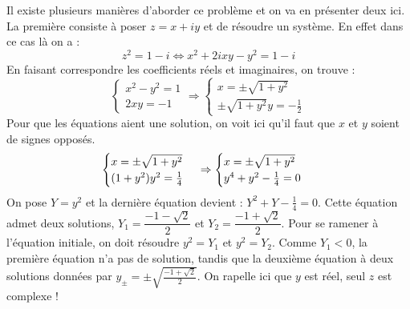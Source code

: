 \documentclass{article}
\begin{document}
Il existe plusieurs manières d'aborder ce problème et on va en présenter deux ici. La première consiste à poser $z = x +iy$ et de résoudre un système. En effet dans ce cas là on a : 
\begin{equation*}
    z^2 = 1-i \iff x^2+2ixy-y^2 = 1-i
\end{equation*}
En faisant correspondre les coefficients réels et imaginaires, on trouve :
\begin{equation*}
    \begin{cases}
        x^2-y^2=1 \\
        2xy = -1
    \end{cases}
    \Rightarrow
     \begin{cases}
        x = \pm\sqrt{1+y^2} \\
        \pm\sqrt{1+y^2}y =-\frac{1}{2} 
    \end{cases}
\end{equation*}
Pour que les équations aient une solution, on voit ici qu'il faut que $x$ et $y$ soient de signes opposés. 
\begin{equation*}
    \begin{cases}
        x = \pm\sqrt{1+y^2} \\
        (1+y^2)y^2 =\frac{1}{4} 
    \end{cases} \\
    \Rightarrow
     \begin{cases}
        x = \pm\sqrt{1+y^2} \\
        y^4+y^2 -\frac{1}{4}=0 
    \end{cases} \\
\end{equation*}
On pose $Y = y^2$ et la dernière équation devient : $Y^2+Y-\frac{1}{4} = 0$.
Cette équation admet deux solutions, $Y_1 = \dfrac{-1-\sqrt{2}}{2}$ et $Y_2 = \dfrac{-1+\sqrt{2}}{2}$. Pour se ramener à l'équation initiale, on doit résoudre $y^2=Y_1$ et $y^2 = Y_2$. Comme $Y_1 < 0$, la première équation n'a pas de solution, tandis que la deuxième équation à deux solutions données par $y_{\pm}=\pm\sqrt{\frac{-1+\sqrt{2}}{2}}$. On rapelle ici que $y$ est réel, seul $z$ est complexe ! 
\end{document}
